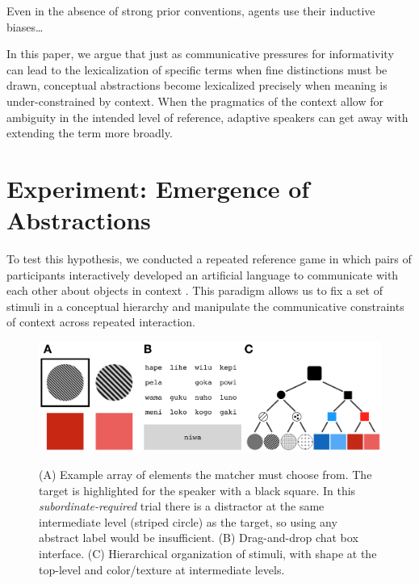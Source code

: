 \documentclass[10pt,letterpaper]{article}
\begin{document}
Even in the absence of strong prior conventions, agents use their inductive biases\dots

In this paper, we argue that just as communicative pressures for informativity can lead to the lexicalization of specific terms when fine distinctions must be drawn, conceptual abstractions become lexicalized precisely when meaning is under-constrained by context. When the pragmatics of the context allow for ambiguity in the intended level of reference, adaptive speakers can get away with extending the term more broadly. 
			
\section{Experiment: Emergence of Abstractions}

To test this hypothesis, we conducted a repeated reference game in which pairs of participants interactively developed an artificial language to communicate with each other about objects in context \cite{WintersKirbySmith14_LanguagesAdapt, GalantucciGarrod11_ExperimentalSemiotics}. This paradigm allows us to fix a set of stimuli in a conceptual hierarchy and manipulate the communicative constraints of context across repeated interaction.

\begin{figure}[t]
\begin{center}
{\includegraphics[scale=.64]{fig.png}}
{\caption{\footnotesize{(A) Example array of elements the matcher must choose from. The target is highlighted for the speaker with a black square. In this \emph{subordinate-required} trial there is a distractor at the same intermediate level (striped circle) as the target, so using any abstract label would be insufficient. (B) Drag-and-drop chat box interface. (C) Hierarchical organization of stimuli, with shape at the top-level and color/texture at intermediate levels.  \label{exp}}}}
\end{center}
\end{figure}
\end{document}
